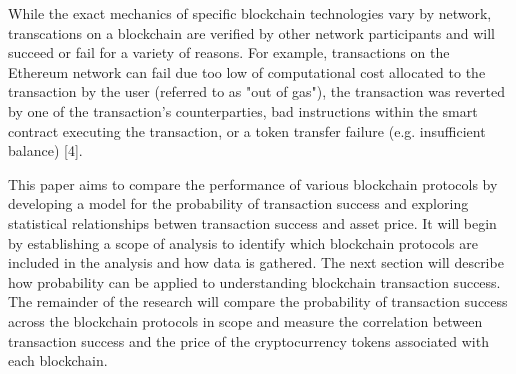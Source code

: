 \documentclass[12pt]{article}
\begin{document}
While the exact mechanics of specific blockchain technologies vary by network, transcations on a blockchain are verified by other network participants and will succeed or fail for a variety of reasons. For example, transactions on the Ethereum network can fail due too low of computational cost allocated to the transaction by the user (referred to as "out of gas"), the transaction was reverted by one of the transaction's counterparties, bad instructions within the smart contract executing the transaction, or a token transfer failure (e.g. insufficient balance) [4].

This paper aims to compare the performance of various blockchain protocols by developing a model for the probability of transaction success and exploring statistical relationships betwen transaction success and asset price. It will begin by establishing a scope of analysis to identify which blockchain protocols are included in the analysis and how data is gathered. The next section will describe how probability can be applied to understanding blockchain transaction success. The remainder of the research will compare the probability of transaction success across the blockchain protocols in scope and measure the correlation between transaction success and the price of the cryptocurrency tokens associated with each blockchain.
\end{document}
